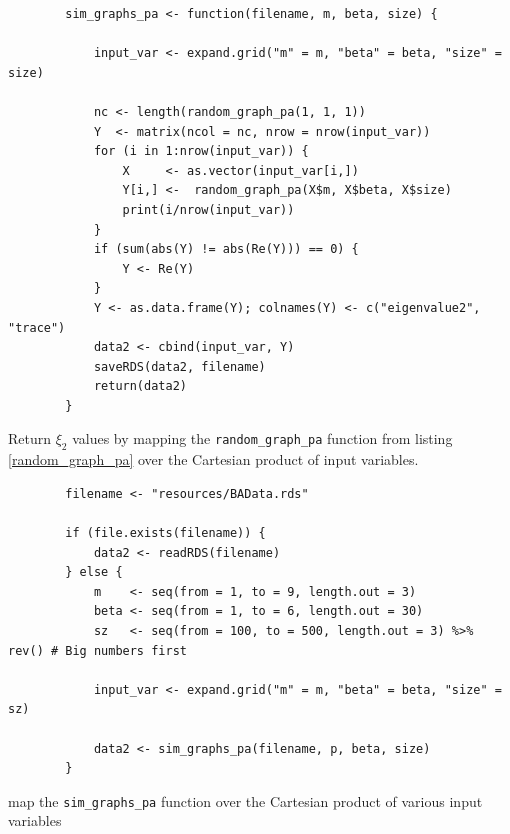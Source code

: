 \documentclass[11pt, twoside]{report}
\begin{document}
\begin{listing}[htbp]
    \begin{tcolorbox}
        \begin{verbatim}
        sim_graphs_pa <- function(filename, m, beta, size) {

            input_var <- expand.grid("m" = m, "beta" = beta, "size" = size)

            nc <- length(random_graph_pa(1, 1, 1))
            Y  <- matrix(ncol = nc, nrow = nrow(input_var))
            for (i in 1:nrow(input_var)) {
                X     <- as.vector(input_var[i,])
                Y[i,] <-  random_graph_pa(X$m, X$beta, X$size)
                print(i/nrow(input_var))
            }
            if (sum(abs(Y) != abs(Re(Y))) == 0) {
                Y <- Re(Y)
            }
            Y <- as.data.frame(Y); colnames(Y) <- c("eigenvalue2", "trace")
            data2 <- cbind(input_var, Y)
            saveRDS(data2, filename)
            return(data2)
        }
        \end{verbatim}
    \end{tcolorbox}
\caption{\label{sim_graphs_pa}Return \(\xi_{2}\) values by mapping the \texttt{random\_graph\_pa} function from listing \ref{random_graph_pa} over the Cartesian product of input variables.}
\end{listing}


\begin{listing}[htbp]
    \begin{tcolorbox}
        \begin{verbatim}
        filename <- "resources/BAData.rds"

        if (file.exists(filename)) {
            data2 <- readRDS(filename)
        } else {
            m    <- seq(from = 1, to = 9, length.out = 3)
            beta <- seq(from = 1, to = 6, length.out = 30)
            sz   <- seq(from = 100, to = 500, length.out = 3) %>% rev() # Big numbers first

            input_var <- expand.grid("m" = m, "beta" = beta, "size" = sz)

            data2 <- sim_graphs_pa(filename, p, beta, size)
        }
        \end{verbatim}
    \end{tcolorbox}
 \caption{\label{l:gen_ba_data} map the \texttt{sim\_graphs\_pa} function over the Cartesian product of various input variables}
\end{listing}
\end{document}
